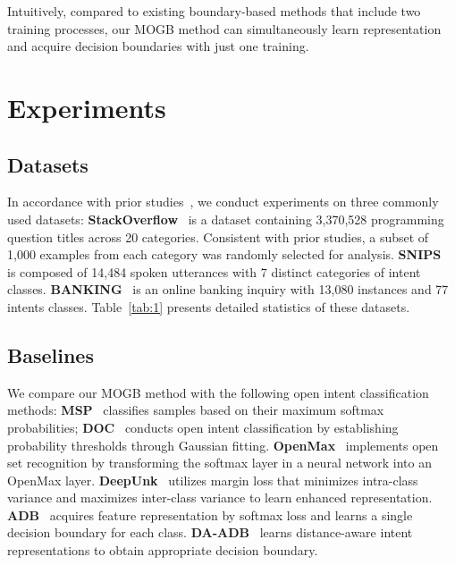 \documentclass[letterpaper]{article} %
\theoremstyle{definition}
\begin{document}
Intuitively, compared to existing boundary-based methods that include two training processes, our MOGB method can simultaneously learn representation and acquire decision boundaries with just one training. 


\section{Experiments}\label{sec:5}
\subsection{Datasets}
In accordance with prior studies~\cite{zhang2021deep,zhang2023learning}, we conduct experiments on three commonly used datasets: 
 \textbf{StackOverﬂow}~\cite{xu2015short} is a dataset containing 3,370,528 programming question titles across 20 categories. Consistent with prior studies, a subset of 1,000 examples from each category was randomly selected for analysis. \textbf{SNIPS}~\cite{coucke2018snips} is composed of 14,484 spoken utterances with 7 distinct categories of intent classes. 
\textbf{BANKING}~\cite{casanueva2020efficient} is an online banking inquiry with 13,080 instances and 77 intents classes.
 Table~\ref{tab:1} presents detailed statistics of these datasets.
 

\subsection{Baselines}
We compare our MOGB method with the following open intent classification methods:
\textbf{MSP}~\cite{hendrycks2022baseline} classifies samples based on their maximum softmax probabilities; 
\textbf{DOC}~\cite{shu2017doc} conducts open intent classification by establishing probability thresholds through Gaussian fitting. 
\textbf{OpenMax}~\cite{bendale2016towards} implements open set recognition by transforming the softmax layer in a neural network into an OpenMax layer. 
\textbf{DeepUnk}~\cite{lin2019deep} utilizes margin loss that minimizes intra-class variance and maximizes inter-class variance to learn enhanced representation.
\textbf{ADB}~\cite{zhang2021deep}  acquires feature representation by softmax loss and learns a single decision boundary for each class.
\textbf{DA-ADB}~\cite{zhang2023learning} learns distance-aware intent representations to obtain appropriate decision boundary.
\end{document}
